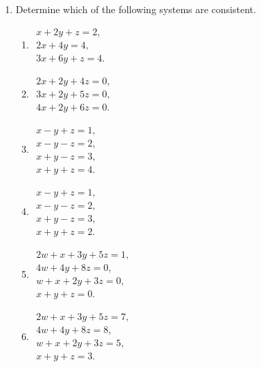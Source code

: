 \begin{enumerate}[leftmargin=*, label=\bfseries 2.3.\arabic*]

\item Determine which of the following systems are consistent.

\begin{enumerate}[label=(\alph*)]
    \item \(\begin{array}{l}
    x + 2y + z = 2, \\
    2x + 4y = 4, \\
    3x + 6y + z = 4.
    \end{array}\)
    
    \item \(\begin{array}{l}
    2x + 2y + 4z = 0, \\
    3x + 2y + 5z = 0, \\
    4x + 2y + 6z = 0.
    \end{array}\)
    
    \item \(\begin{array}{l}
    x - y + z = 1, \\
    x - y - z = 2, \\
    x + y - z = 3, \\
    x + y + z = 4.
    \end{array}\)

    \item \(\begin{array}{l}
    x - y + z = 1, \\
    x - y - z = 2, \\
    x + y - z = 3, \\
    x + y + z = 2.
    \end{array}\)

    \item \(\begin{array}{l}
    2w + x + 3y + 5z = 1, \\
    4w + 4y + 8z = 0, \\
    w + x + 2y + 3z = 0, \\
    x + y + z = 0.
    \end{array}\)

    \item \(\begin{array}{l}
    2w + x + 3y + 5z = 7, \\
    4w + 4y + 8z = 8, \\
    w + x + 2y + 3z = 5, \\
    x + y + z = 3.
    \end{array}\)
\end{enumerate}


\end{enumerate}
